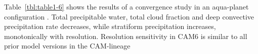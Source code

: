 Table~\ref{tbl:table1-6} shows the results of a convergence study in an aqua-planet configuration \citep[`QOBS' SST profile in][]{NH2000ASL}. Total precipitable water, total cloud fraction and deep convective precipitation rate decreases, while stratiform precipitation increases, monotonically with resolution. Resolution sensitivity in CAM6 is similar to all prior model versions in the CAM-lineage
